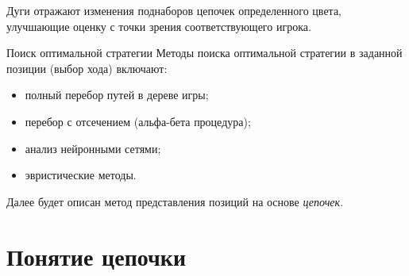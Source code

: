 \documentclass{beamer}
\begin{document}
{Дуги отражают изменения поднаборов цепочек определенного цвета, улучшающие оценку с точки зрения соответствующего игрока.
}


\begin{frame}{Поиск оптимальной стратегии}
Методы поиска оптимальной стратегии в заданной позиции (выбор хода) включают:
\begin{itemize}
\item полный перебор путей в дереве игры;
\item перебор с отсечением (альфа-бета процедура);
\item анализ нейронными сетями;
\item эвристические методы.
\end{itemize}
Далее будет описан метод представления позиций на основе \emph{цепочек}.
\end{frame}


\section{Понятие цепочки}
\end{document}
